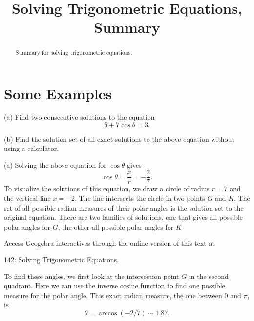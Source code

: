 \documentclass{ximera}
\title{Solving Trigonometric Equations, Summary}
\begin{document}
\begin{abstract}
Summary for solving trigonometric equations.
\end{abstract}
\maketitle

\section{Some Examples}

\begin{example}  \label{Ex:433g3e}
(a) Find two consecutive solutions to the equation
\[
   5 +  7 \cos\theta =  3 .  
\]

(b) Find the solution set of all exact solutions to the above equation without using a calculator.

\begin{explanation}
(a) Solving the above equation for $\cos\theta$ gives 
\[
   \cos \theta = \frac{x}{r} = -\frac{2}{7}.
\]
To visualize the solutions of this equation, we draw a circle of radius $r=7$ and the vertical line $x=-2$. The line intersects the circle in two points $G$ and $K$. The set of all possible radian measures of their polar angles is the solution set to the original equation. There are two families of solutions, one that gives all possible polar angles for $G$, the other all possible polar angles for $K$
 
 
\begin{onlineOnly}
    \begin{center}
\end{center}
\end{onlineOnly}

Access Geogebra interactives through the online version of this text at
 
\href{https://www.geogebra.org/classic/qnhtd4h8}{142: Solving Trigonometric Equations}.


To find these angles, we first look at the intersection point $G$ in the second quadrant. Here we can use the inverse cosine function to find one possible measure for the polar angle. This exact radian measure, the one between $0$ and $\pi$, is 
\[
  \theta = \arccos(-2/7) \sim 1.87.
\]


\end{explanation}
\end{example}
\end{document}
